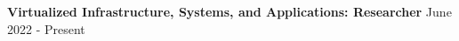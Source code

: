 \textbf{Virtualized Infrastructure, Systems, and Applications: Researcher} \hfill June 2022 - Present
